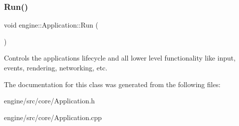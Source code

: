 \subsubsection{\texorpdfstring{Run()}{Run()}}
{\footnotesize\ttfamily void engine\+::\+Application\+::\+Run (\begin{DoxyParamCaption}{ }\end{DoxyParamCaption})}

Controls the applications lifecycle and all lower level functionality like input, events, rendering, networking, etc. 

The documentation for this class was generated from the following files\+:\begin{DoxyCompactItemize}
\item 
engine/src/core/Application.\+h\item 
engine/src/core/Application.\+cpp\end{DoxyCompactItemize}
